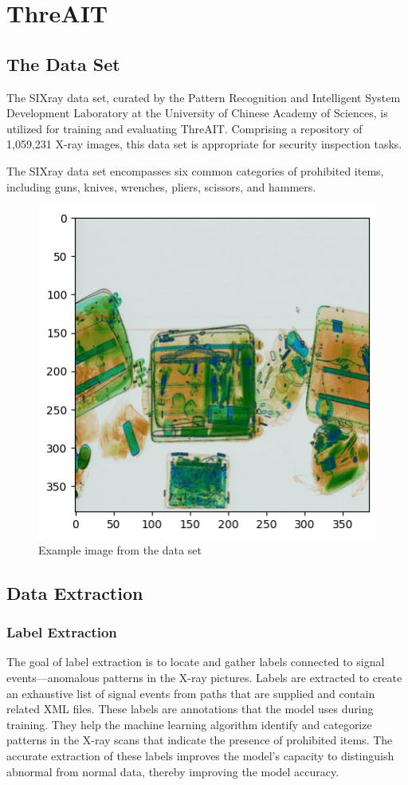\documentclass{article}
\begin{document}
\section{ThreAIT}
\subsection{The Data Set}
The SIXray data set, curated by the Pattern Recognition and Intelligent System Development Laboratory at the University of Chinese Academy of Sciences, is utilized for training and evaluating ThreAIT. Comprising a repository of 1,059,231 X-ray images, this data set is appropriate for security inspection tasks.

The SIXray data set encompasses six common categories of prohibited items, including guns, knives, wrenches, pliers, scissors, and hammers.

\begin{figure}[h!]
    \centering
    \includegraphics[width=0.75\linewidth]{img/example.png}
    \caption{Example image from the data set}
    \label{fig:example-image}
\end{figure}

\subsection{Data Extraction}

\subsubsection{Label Extraction}
The goal of label extraction is to locate and gather labels connected to signal events—anomalous patterns in the X-ray pictures. Labels are extracted to create an exhaustive list of signal events from paths that are supplied and contain related XML files. These labels are annotations that the model uses during training. They help the machine learning algorithm identify and categorize patterns in the X-ray scans that indicate the presence of prohibited items. The accurate extraction of these labels improves the model's capacity to distinguish abnormal from normal data, thereby improving the model accuracy.
\end{document}
